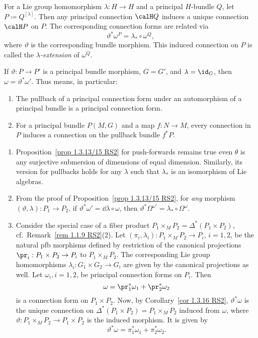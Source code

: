 \begin{cor}[{{\cite[Cor.~1.3.14]{RS2}}}]\label{cor 1.3.14 RS2}
    For a Lie group homomorphism $\lambda:H\to H$ and a principal $H$-bundle $Q$, let $P\coloneqq Q^{[\lambda]}$. Then any principal connection $\calH Q$ induces a unique connection $\calH P$ on $P$. The corresponding connection forms are related via
    \[\vartheta^\ast\omega^P=\lambda_\ast\circ \omega^Q,\]
    where $\vartheta$ is the corresponding bundle morphism. This induced connection on $P$ is called the \emph{$\lambda$-extension} of $\omega^Q$.
\end{cor}

\begin{cor}[{{\cite[Cor.~1.3.16]{RS2}}}]\label{cor 1.3.16 RS2}
    If $\vartheta:P\to P'$ is a principal bundle morphism, $G=G'$, and $\lambda=\id_G$, then $\omega=\vartheta^\ast\omega'$. Thus means, in particular:
    \begin{enumerate}
        \item The pullback of a principal connection form under an automorphism of a principal bundle is a principal connection form.
        \item For a principal bundle $P(M,G)$ and a map $f:N\to M$, every connection in $P$ induces a connection on the pullback bundle $f^\ast P$.
    \end{enumerate}
\end{cor}


\begin{rem}\label{rem 1.3.17 RS2}
    \begin{enumerate}
        \item Proposition~\ref{prop 1.3.13/15 RS2} for push-forwards remains true even $\theta$ is any surjective submersion of dimensions of equal dimension. Similarly, its version for pullbacks holds for any $\lambda$ such that $\lambda_\ast$ is an isomorphism of Lie algebras.
        \item From the proof of Proposition~\ref{prop 1.3.13/15 RS2}, for \emph{any} morphism $(\vartheta,\lambda):P_1\to P_2$, if $\vartheta^\ast \omega'=\dd\lambda\circ\omega$, then $\vartheta^\ast\Omega^{\omega'}=\lambda_\ast \circ\Omega^\omega$.
        \item Consider the special case of a fiber product $P_1\times_M P_2=\Delta^\ast(P_1\times P_2)$, cf.\ Remark~\ref{rem 1.1.9 RS2}(2). Let $(\pi_i,\lambda_i):P_1\times_M P_2\to P_i$, $i=1,2$, be the natural \gls{pfb} morphisms defined by restriction of the canonical projections $\pr_i:P_1\times P_2\to P_i$ to $P_1\times_M P_2$. The corresponding Lie group homomorphisms $\lambda_i:G_1\times G_2\to G_i$ are given by the canonical projections as well. Let $\omega_i,i=1,2$, be principal connection forms on $P_i$. Then
        \[\omega=\pr_1^\ast\omega_1+\pr_2^\ast\omega_2\]
        is a connection form on $P_1\times P_2$. Now, by Corollary~\ref{cor 1.3.16 RS2}, $\vartheta^\ast\omega$ is the unique connection on $\Delta^\ast(P_1\times P_2)=P_1\times_M P_2$ induced from $\omega$, where $\vartheta:P_1\times_M P_2\to P_1\times P_2$ is the induced morphism. It is given by
        \[\vartheta^\ast\omega=\pi_1^\ast \omega_1+\pi_2^\ast\omega_2.\label{eq 1.3.16 RS2}\]
    \end{enumerate}
\end{rem}

